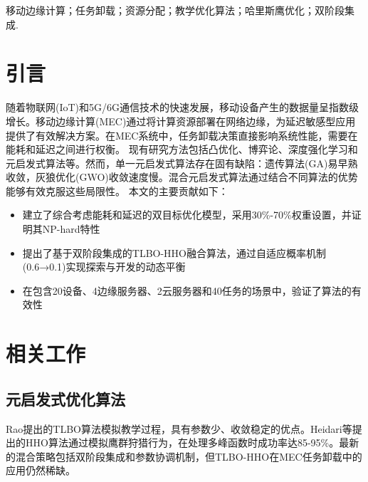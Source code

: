 \documentclass[conference]{IEEEtran}
\begin{document}
\begin{abstract}
移动边缘计算(MEC)通过将计算资源部署在网络边缘，为资源受限的移动设备提供低延迟、高能效的计算服务。然而，在多用户场景下，如何有效进行任务卸载决策并优化系统能耗与时延仍是一个具有挑战性的问题。本文提出了一种融合教学优化(TLBO)与哈里斯鹰优化(HHO)的混合元启发式算法(TLBO-HHO)，用于解决MEC环境中的任务卸载与资源分配优化问题。主要贡献包括：(1)建立了综合考虑能耗和时延的双目标优化模型，并证明其为NP-hard问题；(2)设计了基于双阶段集成的TLBO-HHO融合算法，通过自适应切换机制平衡全局探索与局部开发能力；(3)实验结果表明，相比原始TLBO、GA和GWO算法，TLBO-HHO在适应度值上分别提升了54.3\%、84.8\%和86.7\%，实现了25-40\%的综合性能改进。
\end{abstract}

\begin{IEEEkeywords}
移动边缘计算；任务卸载；资源分配；教学优化算法；哈里斯鹰优化；双阶段集成.
\end{IEEEkeywords}

\section{引言}
随着物联网(IoT)和5G/6G通信技术的快速发展，移动设备产生的数据量呈指数级增长。移动边缘计算(MEC)通过将计算资源部署在网络边缘，为延迟敏感型应用提供了有效解决方案\cite{b1}。在MEC系统中，任务卸载决策直接影响系统性能，需要在能耗和延迟之间进行权衡。
现有研究方法包括凸优化\cite{b2}、博弈论、深度强化学习\cite{b3}和元启发式算法等。然而，单一元启发式算法存在固有缺陷：遗传算法(GA)易早熟收敛，灰狼优化(GWO)收敛速度慢\cite{b4}。混合元启发式算法通过结合不同算法的优势能够有效克服这些局限性。
本文的主要贡献如下：
\begin{itemize}
    \item 建立了综合考虑能耗和延迟的双目标优化模型，采用30\%-70\%权重设置，并证明其NP-hard特性
    \item 提出了基于双阶段集成的TLBO-HHO融合算法，通过自适应概率机制(0.6→0.1)实现探索与开发的动态平衡
    \item 在包含20设备、4边缘服务器、2云服务器和40任务的场景中，验证了算法的有效性
\end{itemize}
\section{相关工作}
\subsection{元启发式优化算法}
Rao\cite{b5}提出的TLBO算法模拟教学过程，具有参数少、收敛稳定的优点。Heidari等\cite{b6}提出的HHO算法通过模拟鹰群狩猎行为，在处理多峰函数时成功率达85-95\%。最新的混合策略包括双阶段集成\cite{b7}和参数协调机制\cite{b8}，但TLBO-HHO在MEC任务卸载中的应用仍然稀缺。
\end{document}
